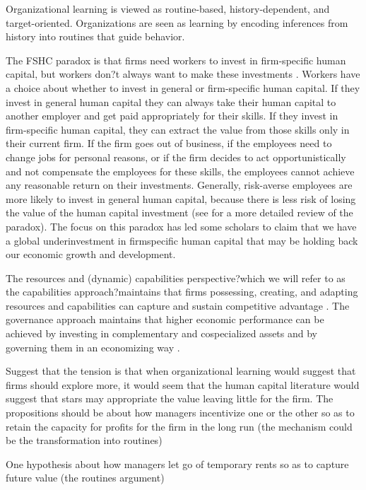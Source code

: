 \documentclass[12pt,letterpaper]{article}
\begin{document}
Organizational learning is viewed as routine-based, history-dependent, and target-oriented. Organizations are seen as learning by encoding inferences from history into routines that guide behavior.

The FSHC paradox is that firms need workers to invest in firm-specific human capital, but workers don?t always want to make these investments \citep{Wang2006}. Workers have a choice about whether to invest in general or firm-specific human capital. If they invest in general human capital they can always take their human capital to another employer and get paid appropriately for their skills. If
they invest in firm-specific human capital, they can extract the value from those skills only in their current firm. If the firm goes out of business, if the employees need to change jobs for personal reasons, or if the firm decides to act opportunistically and not compensate the employees for these skills, the employees cannot achieve any reasonable return on their investments. Generally, risk-averse employees are more likely to invest in general human capital, because there is less risk of losing the value of the human capital investment (see \cite{Wang2006} for a more detailed review of the paradox). The focus on this paradox has led some scholars to claim
that we have a global underinvestment in firmspecific human capital that may be holding back our economic growth and development.

The resources and (dynamic) capabilities perspective?which we will refer to as the capabilities approach?maintains that firms possessing, creating, and adapting resources and capabilities can capture and sustain competitive advantage \citep{Barney1991, 
Penrose1959, Teece1997}. The governance approach maintains that higher economic performance can be achieved by investing in complementary and cospecialized assets \citep{Helfat1997, Teece1986} and by governing them in an economizing way \citep{Oxley1997, Williamson1985}.

Suggest that the tension is that when organizational learning would suggest that firms should explore more, it would seem that the human capital literature would suggest that stars may appropriate the value leaving little for the firm. The propositions should be about how managers incentivize one or the other so as to retain the capacity for profits for the firm in the long run (the mechanism could be the transformation into routines)

One hypothesis about how managers let go of temporary rents so as to capture future value (the routines argument)
\end{document}
